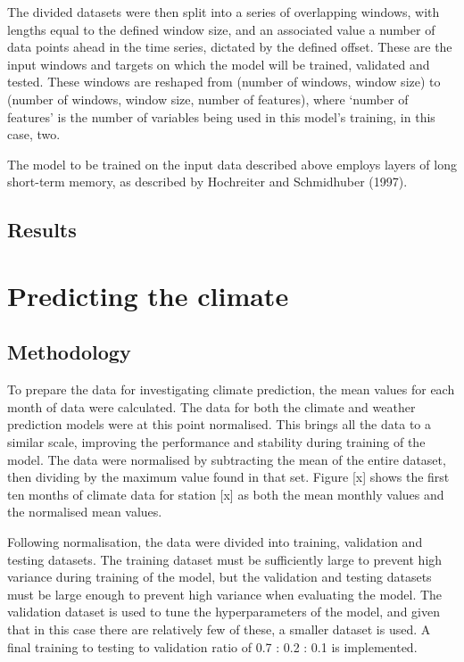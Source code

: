 \documentclass[12pt]{article}
\begin{document}
The divided datasets were then split into a series of overlapping windows, with lengths equal to the defined window size, and an associated 
value a number of data points ahead in the time series, dictated by the defined offset. These are the input windows and targets on which the 
model will be trained, validated and tested. These windows are reshaped from (number of windows, window size) to (number of windows, window 
size, number of features), where ‘number of features’ is the number of variables being used in this model’s training, in this case, two.

The model to be trained on the input data described above employs layers of long short-term memory, as described by Hochreiter and Schmidhuber (1997).

\subsection{Results}

\section{Predicting the climate}

\subsection{Methodology}

To prepare the data for investigating climate prediction, the mean values for each month of data were calculated. The data for both the climate
 and weather prediction models were at this point normalised. This brings all the data to a similar scale, improving the performance and 
 stability during training of the model. The data were normalised by subtracting the mean of the entire dataset, then dividing by the maximum 
 value found in that set. Figure [x] shows the first ten months of climate data for station [x] as both the mean monthly values and the 
 normalised mean values.

Following normalisation, the data were divided into training, validation and testing datasets. The training dataset must be sufficiently 
large to prevent high variance during training of the model, but the validation and testing datasets must be large enough to prevent high 
variance when evaluating the model. The validation dataset is used to tune the hyperparameters of the model, and given that in this case 
there are relatively few of these, a smaller dataset is used. A final training to testing to validation ratio of 0.7 : 0.2 : 0.1 is implemented.
\end{document}

